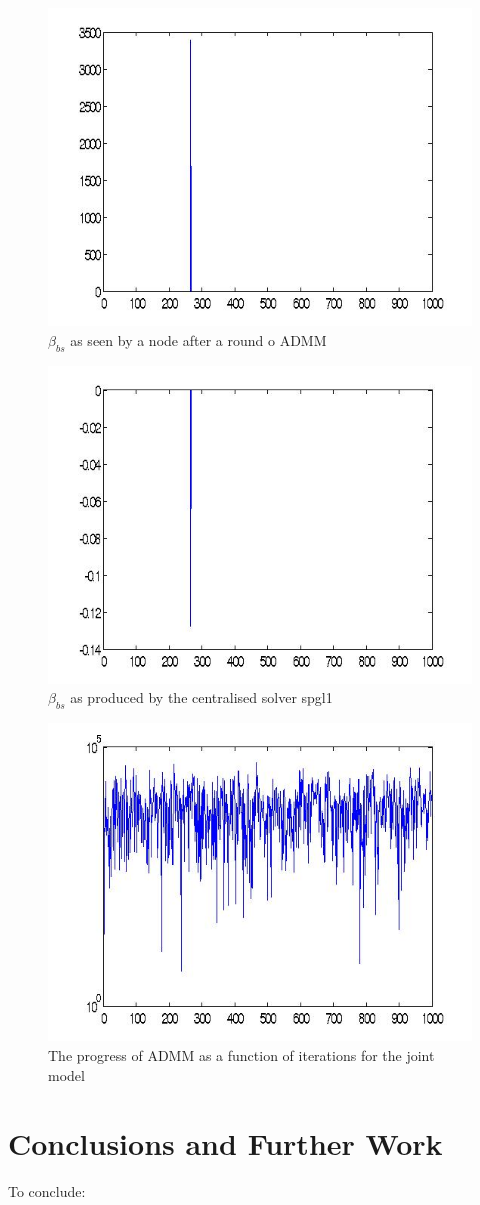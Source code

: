 \documentclass{article}
\begin{document}
\begin{figure}[htb]
\centering
\includegraphics[height = 5 cm]{node1.jpg}
\caption{\(\beta_{bs}\) as seen by a node after a round o ADMM}
\label{betanode}
\end{figure}

\begin{figure}[htb]
\centering
\includegraphics[height = 5 cm]{spatialcentral.jpg}
\caption{\(\beta_{bs}\) as produced by the centralised solver spgl1}
\label{betacentral}
\end{figure}

\begin{figure}[htb]
\centering
\includegraphics[height = 5 cm]{spatialiterations.jpg}
\caption{The progress of ADMM as a function of iterations for the joint model}
\label{spatialiterations}
\end{figure}
\clearpage{}
\section{Conclusions and Further Work}
To conclude:
\end{document}
